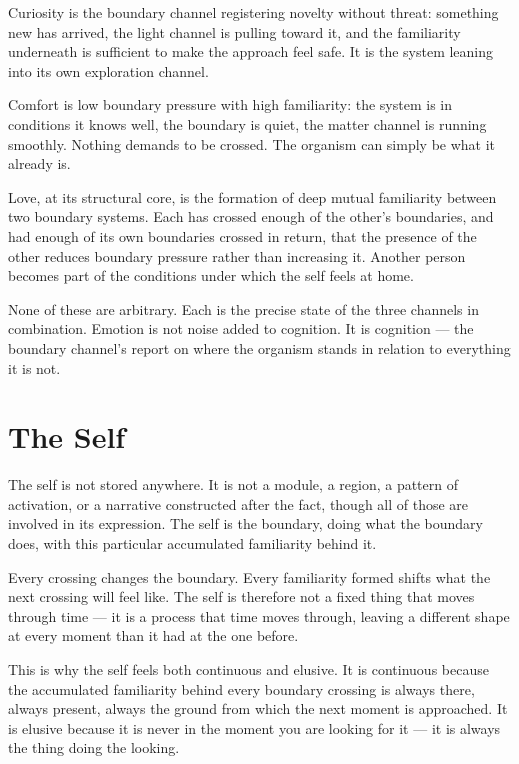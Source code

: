 \documentclass[12pt]{article}
\begin{document}
Curiosity is the boundary channel registering novelty without threat: something
new has arrived, the light channel is pulling toward it, and the familiarity
underneath is sufficient to make the approach feel safe. It is the system
leaning into its own exploration channel.

Comfort is low boundary pressure with high familiarity: the system is in
conditions it knows well, the boundary is quiet, the matter channel is running
smoothly. Nothing demands to be crossed. The organism can simply be what it
already is.

Love, at its structural core, is the formation of deep mutual familiarity between
two boundary systems. Each has crossed enough of the other's boundaries, and had
enough of its own boundaries crossed in return, that the presence of the other
reduces boundary pressure rather than increasing it. Another person becomes part
of the conditions under which the self feels at home.

None of these are arbitrary. Each is the precise state of the three channels in
combination. Emotion is not noise added to cognition. It is cognition --- the
boundary channel's report on where the organism stands in relation to everything
it is not.

\section{The Self}

The self is not stored anywhere. It is not a module, a region, a pattern of
activation, or a narrative constructed after the fact, though all of those are
involved in its expression. The self is the boundary, doing what the boundary
does, with this particular accumulated familiarity behind it.

Every crossing changes the boundary. Every familiarity formed shifts what the
next crossing will feel like. The self is therefore not a fixed thing that moves
through time --- it is a process that time moves through, leaving a different
shape at every moment than it had at the one before.

This is why the self feels both continuous and elusive. It is continuous because
the accumulated familiarity behind every boundary crossing is always there,
always present, always the ground from which the next moment is approached. It
is elusive because it is never in the moment you are looking for it --- it is
always the thing doing the looking.
\end{document}

